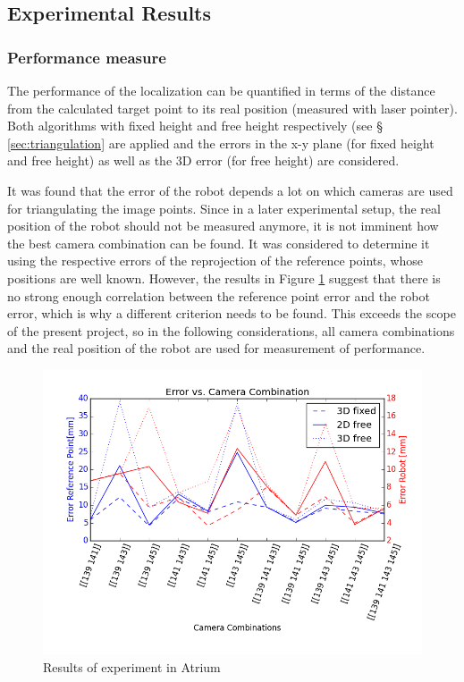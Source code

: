 \subsection{Experimental Results}

\subsubsection{Performance measure}
The performance of the localization can be quantified in terms of the distance from the calculated target point to its real position (measured with laser pointer). 
Both algorithms with fixed height and free height respectively (see § \ref{sec:triangulation} are applied and the errors in the x-y plane (for fixed height and free height) as well as the 3D error (for free height) are considered. 

It was found that the error of the robot depends a lot on which cameras are used for triangulating the image points. 
Since in a later experimental setup, the real position of the robot should not be measured anymore, it is not imminent how the best camera combination can be found. 
It was considered to determine it using the respective errors of the reprojection of the reference points, whose positions are well known. 
However, the results in Figure \ref{fig:res0_err} suggest that there is no strong enough correlation between the reference point error and the robot error, which is why a different criterion needs to be found. 
This exceeds the scope of the present project, so in the following considerations, all camera combinations and the real position of the robot are used for measurement of performance. 

\begin{figure}[H] 
    \centering
    \includegraphics[width=.8\linewidth]{files/res0_combi_4.png}
    \caption{Results of experiment in Atrium}
    \label{fig:res0_err}
\end{figure}

